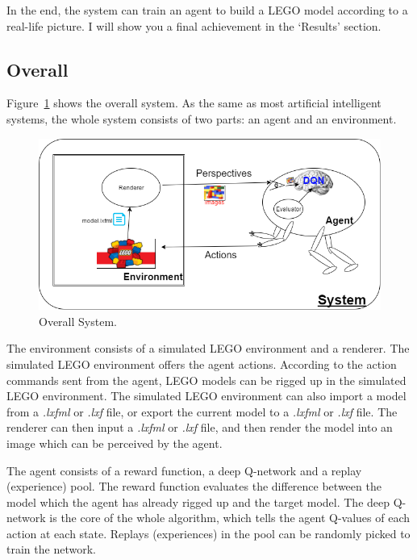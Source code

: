 \documentclass[a4paper]{article}
\begin{document}
        In the end, the system can train an agent to build a LEGO model according to a real-life picture. I will show you a final achievement in the `Results' section.
    
        \subsection{Overall}
        
            Figure~\ref{fig:system1} shows the overall system. As the same as most artificial intelligent systems, the whole system consists of two parts: an agent and an environment.
            \begin{figure}[h]
                \centering
                \includegraphics[width=\textwidth]{agent_env.png}
                \caption{Overall System.}
                \label{fig:system1}
            \end{figure}
            
            The environment consists of a simulated LEGO environment and a renderer. The simulated LEGO environment offers the agent actions. According to the action commands sent from the agent, LEGO models can be rigged up in the simulated LEGO environment. The simulated LEGO environment can also import a model from a \textit{.lxfml} or \textit{.lxf} file, or export the current model to a \textit{.lxfml} or \textit{.lxf} file. The renderer can then input a \textit{.lxfml} or \textit{.lxf} file, and then render the model into an image which can be perceived by the agent. 
            
            The agent consists of a reward function, a deep Q-network and a replay (experience) pool. The reward function evaluates the difference between the model which the agent has already rigged up and the target model. The deep Q-network is the core of the whole algorithm, which tells the agent Q-values of each action at each state. Replays (experiences) in the pool can be randomly picked to train the network. 
            
\end{document}
